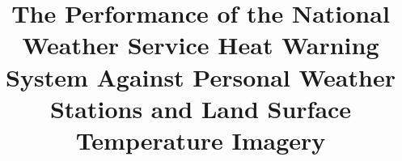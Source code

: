 \documentclass{ametsoc}
\title{The Performance of the National Weather Service Heat Warning System Against Personal Weather Stations and Land Surface Temperature Imagery}
\affiliation{Nelson Institute for Environmental Studies, University of Wisconsin-Madison}
\begin{document}
\maketitle{}

%






\end{document}
